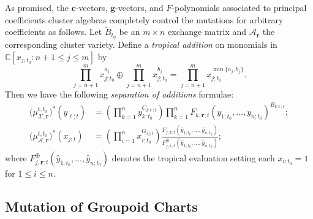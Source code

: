 \documentclass{amsart}
\numberwithin{equation}{section}
\newcommand{\bfc}{\mathbf{c}}
\newcommand{\bfg}{\mathbf{g}}
\newcommand{\bfr}{{\boldsymbol{r}}}
\newcommand{\cA}{\mathcal{A}}
\newcommand{\cX}{\mathcal{X}}
\newcommand{\CC}{\mathbb{C}}
\begin{document}
As promised, the $\bfc$-vectors, $\bfg$-vectors, and $F$-polynomials associated to principal coefficients cluster algebras completely control the mutations for arbitrary coefficients as follows.
Let $\tilde B_{t_0}$ be an $m\times n$ exchange matrix and $\cA_\bfr$ the corresponding cluster variety.
Define a \emph{tropical addition} on monomials in $\CC[x_{j;t_0}:n+1\le j\le m]$ by
\[\prod_{j=n+1}^m x_{j;t_0}^{a_j}\oplus \prod_{j=n+1}^m x_{j;t_0}^{b_j}=\prod_{j=n+1}^m x_{j;t_0}^{\min\{a_j,b_j\}}.\]
Then we have the following \emph{separation of additions} formulae:
\begin{align}
  \label{eq:separation of additions 1}
  \big(\mu_{\cX,\bfr}^{t,t_0}\big)^*(y_{\ell;t})&=\left(\prod_{k=1}^n y_{k;t_0}^{C_{k \ell;t}}\right) \prod_{k=1}^n F_{k,\bfr;t}(y_{1;t_0},\ldots,y_{n;t_0})^{B_{k \ell;t}};\\
  \label{eq:separation of additions 2}
  \big(\mu_{\cA,\bfr}^{t,t_0}\big)^*(x_{j;t})&=\left(\prod_{i=1}^n x_{i;t_0}^{G_{ij;t}}\right) \frac{F_{j,\bfr;t}(\hat y_{1;t_0},\ldots,\hat y_{n;t_0})}{F_{j,\bfr;t}^{\oplus}(\hat y_{1;t_0},\ldots,\hat y_{n;t_0})};
\end{align}
where $F_{j,\bfr;t}^{\oplus}(\hat y_{1;t_0},\ldots,\hat y_{n;t_0})$ denotes the tropical evaluation setting each $x_{i;t_0}=1$ for $1\le i \le n$.


\subsection{Mutation of Groupoid Charts}
\label{sec:groupoid mutations}
\end{document}
